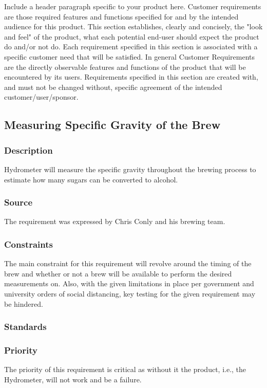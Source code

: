Include a header paragraph specific to your product here. Customer requirements are those required features and functions specified for and by the intended audience for this product. This section establishes, clearly and concisely, the "look and feel" of the product, what each potential end-user should expect the product do and/or not do. Each requirement specified in this section is associated with a specific customer need that will be satisfied. In general Customer Requirements are the directly observable features and functions of the product that will be encountered by its users. Requirements specified in this section are created with, and must not be changed without, specific agreement of the intended customer/user/sponsor.

\subsection{Measuring Specific Gravity of the Brew}
\subsubsection{Description}
Hydrometer will measure the specific gravity throughout the brewing process to estimate how many sugars can be converted to alcohol.
\subsubsection{Source}
The requirement was expressed by Chris Conly and his brewing team.
\subsubsection{Constraints}
The main constraint for this requirement will revolve around the timing of the brew and whether or not a brew will be available to perform the desired measurements on. Also, with the given limitations in place per government and university orders of social distancing, key testing for the given requirement may be hindered.
\subsubsection{Standards}

\subsubsection{Priority}
The priority of this requirement is critical as without it the product, i.e., the Hydrometer, will not work and be a failure.
